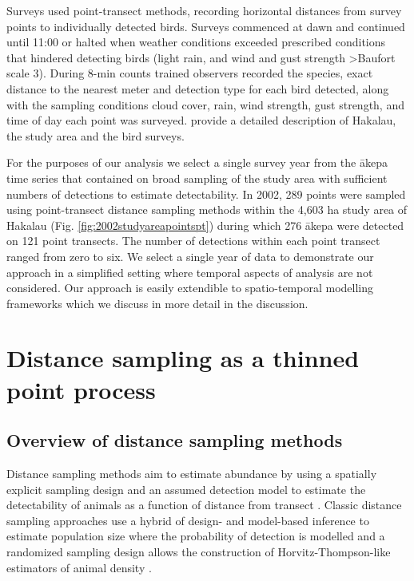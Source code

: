 \documentclass[preprint,12pt]{elsarticle}
\newcommand{\akepa}{\textquotesingle\={a}kepa}  %
\begin{document}
Surveys used point-transect methods, recording horizontal distances from survey points to individually detected birds. Surveys commenced at dawn and continued until 11:00 or halted when weather conditions exceeded prescribed conditions that hindered detecting birds (light rain, and wind and gust strength \textgreater Baufort scale 3). During 8-min counts trained observers recorded the species, exact distance to the nearest meter and detection type for each bird detected, along with the sampling conditions cloud cover, rain, wind strength, gust strength, and time of day each point was surveyed.  \cite{camp_population_2010,camp_statespace_2016} provide a detailed description of Hakalau, the study area and the bird surveys.

For the purposes of our analysis we select a single survey year from the \akepa{} time series that contained on broad sampling of the study area with sufficient numbers of detections to estimate detectability. In 2002, 289 points were sampled using point-transect distance sampling methods within the 4,603 ha study area of Hakalau (Fig. \ref{fig:2002studyareapointspt}) during which 276 \akepa{} were detected on 121 point transects. The number of detections within each point transect ranged from zero to six. We select a single year of data to demonstrate our approach in a simplified setting where temporal aspects of analysis are not considered.  Our approach is easily extendible to spatio-temporal modelling frameworks which we discuss in more detail in the discussion.

\section{Distance sampling as a thinned point process}

\subsection{Overview of distance sampling methods}

Distance sampling methods aim to estimate abundance by using a spatially explicit sampling design and an assumed detection model to estimate the detectability of animals as a function of distance from transect \citep{buckland_advanced_2004, buckland_distance_2015}.  Classic distance sampling approaches use a hybrid of design- and model-based inference to estimate population size where the probability of detection is modelled and a randomized sampling design allows the construction of Horvitz-Thompson-like estimators of animal density \citep{horvitz_generalization_1952,  buckland_advanced_2004}.
\end{document}
